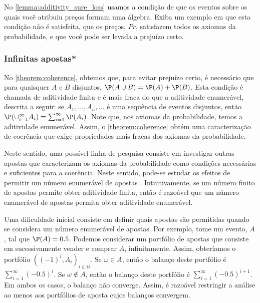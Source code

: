 \begin{exercise}[Desafio]
 No \cref{lemma:additivity_sure_loss} usamos 
 a condição de que os eventos sobre os quais 
 você atribuiu preços formam uma álgebra.
 Exiba um exemplo em que esta condição não é satisfeita,
 que os preços, $Pr$, satisfazem todos 
 os axiomas da probabilidade,
 e que você pode ser levada a prejuízo certo.
\end{exercise}

\subsubsection{Infinitas apostas*}

No \cref{theorem:coherence}, 
obtemos que, para evitar prejuízo certo,
é necessário que para quaisquer $A$ e $B$ disjuntos,
$\P(A \cup B) = \P(A) + \P(B)$. 
Esta condição é chamada de aditividade finita e 
é mais fraca do que a aditividade enumerável,
descrita a seguir: 
se $A_{1},\ldots,A_{n},\ldots$ é 
uma sequência de eventos disjuntos, então 
$\P(\cup_{i=1}^{\infty}A_i) = \sum_{i=1}^{\infty}{\P(A_i)}$.
Note que, nos axiomas da probabilidade, 
temos a aditividade enumerável.
Assim, o \cref{theorem:coherence} obtém 
uma caracterização de coerência que 
exige propriedades mais fracas 
dos axiomas da probabilidade.

Neste sentido, uma possível linha de pesquisa consiste
em investigar outras apostas que caracterizam os
axiomas da probabilidade como 
condições necessárias e suficientes para a coerência.
Neste sentido, pode-se estudar os efeitos de 
permitir um número enumerável de apostas
\citep{Stern2015}.
Intuitivamente, se um número finito de apostas permite
obter aditividade finita, então 
é razoável que um número enumerável de apostas permita
obter aditividade enumerável.

Uma dificuldade inicial consiste em definir quais
apostas são permitidas quando se 
considera um número enumerável de apostas.
Por exemplo, tome um evento, $A$, tal que 
$\P(A) = 0.5$. Podemos considerar um 
portfólio de apostas que consiste em 
sucessivamente vender e comprar $A$, infinitamente.
Assim, obteríamos o portfólio 
$((-1)^{i},A_{i})_{i \in \mathbb{N}}$.
Se $\omega \in A$, então o balanço deste portfólio é $\sum_{i=1}^{\infty}{(-0.5)^{i}}$.
Se $\omega \notin A$, então 
o balanço deste portfólio é 
$\sum_{i=1}^{\infty}{(-0.5)^{i+1}}$.
Em ambos os casos, o balanço não converge.
Assim, é razoável restringir a análise ao menos 
aos portfólios de aposta cujos balanços convergem.

